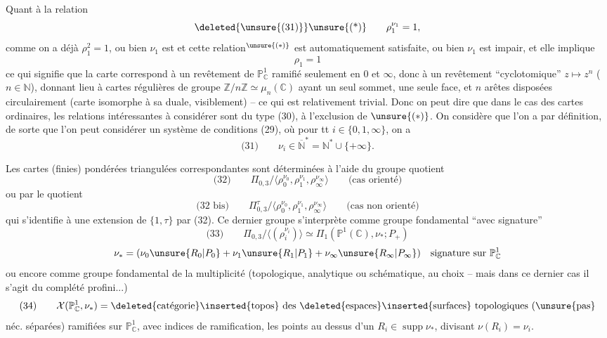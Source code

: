 Quant à la relation
\[
\text{\deleted{\unsure{(31)}}\unsure{(*)}}\qquad \rho_1^{\nu_1}=1,
\]
comme on a déjà $\rho_1^2=1$, ou bien $\nu_1$ est  et cette relation$^{\unsure{(*)}}$ est automatiquement satisfaite, ou bien $\nu_1$ est impair, et elle implique
\[
\rho_1=1
\]
ce qui signifie que la carte correspond à un revêtement de $\mathbb P^1_{\mathbb C}$ ramifié seulement en $0$ et $\infty$, donc à un revêtement ``cyclotomique'' $z\mapsto z^n$ ($n\in\mathbb N$),  donnant lieu à  cartes régulières  de groupe $\mathbb Z/n\mathbb Z\simeq\mu_n(\mathbb C)$ ayant un seul sommet, une seule face, et $n$ arêtes disposées circulairement (carte isomorphe à sa duale, visiblement) -- ce qui est relativement trivial. Donc on peut dire
que dans le cas des cartes ordinaires, les relations intéressantes à considérer sont du type (30), à l'exclusion de $\unsure{(*)}$.  On considère que l'on a  par définition, de sorte que l'on peut considérer un système de conditions (29), où pour tt $i\in\{0,1,\infty\}$, on a
\[
\text{(31)}\qquad \nu_i\in\overline{\mathbb N}^{*}=\mathbb N^{*}\cup\{+\infty\}.
\]

Les cartes (finies) pondérées triangulées correspondantes sont déterminées à l'aide du groupe quotient
\[
\text{(32)}\qquad
\Pi_{0,3}/\langle\rho_0^{\nu_0},\rho_1^{\nu_1},\rho_\infty^{\nu_\infty}\rangle
\qquad\text{(cas orienté)}
\]
ou par le quotient
\[
\text{(32 bis)}\qquad
\Pi_{0,3}^{\tau}/\langle\rho_0^{\nu_0},\rho_1^{\nu_1},\rho_\infty^{\nu_\infty}\rangle
\qquad\text{(cas non orienté)}
\]
qui s'identifie à une extension de $\{1,\tau\}$ par (32). Ce dernier groupe s'interprète comme groupe fondamental ``avec signature''
\[
\text{(33)}\qquad
\Pi_{0,3}/\langle(\rho_i^{\nu_i})\rangle
\simeq\Pi_1(\mathbb P^1(\mathbb C),\nu_*;P_+)
\]
\[
\nu_*=(\nu_0\unsure{R_0|P_0}+\nu_1\unsure{R_1|P_1}+\nu_\infty\unsure{R_\infty|P_\infty})
\quad\text{signature sur }\mathbb P^1_{\mathbb C}
\]
ou encore comme groupe fondamental de la multiplicité (topologique, analytique ou schématique, au choix -- mais dans ce dernier cas il s'agit du complété profini...)
\[
\text{(34)}\qquad
\mathcal X(\mathbb P^1_{\mathbb C},\nu_*)=
\deleted{\text{catégorie}}\inserted{\text{topos}}\ \text{des }\deleted{\text{espaces}}\inserted{\text{surfaces}}\ \text{topologiques (\unsure{pas}}
\]
néc. séparées) ramifiées sur $\mathbb P^1_{\mathbb C}$, avec indices de ramification,  les points au dessus d'un $R_i\in\operatorname{supp}\nu_*$, divisant $\nu(R_i)=\nu_i$.

